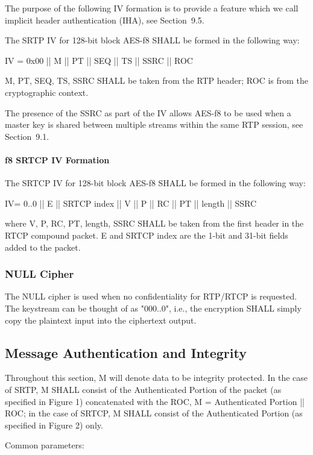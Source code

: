 \documentclass{article}
\begin{document}
The purpose of the following IV formation is to provide a feature which we call implicit header authentication (IHA), see Section~9.5.

The SRTP IV for 128-bit block AES-f8 SHALL be formed in the following way:

IV = 0x00 || M || PT || SEQ || TS || SSRC || ROC

M, PT, SEQ, TS, SSRC SHALL be taken from the RTP header; ROC is from the cryptographic context.

The presence of the SSRC as part of the IV allows AES-f8 to be used when a master key is shared between multiple streams within the same RTP session, see Section~9.1.

\paragraph{f8 SRTCP IV Formation}

The SRTCP IV for 128-bit block AES-f8 SHALL be formed in the following way:

IV= 0..0 || E || SRTCP index || V || P || RC || PT || length || SSRC

where V, P, RC, PT, length, SSRC SHALL be taken from the first header in the RTCP compound packet.  E and SRTCP index are the 1-bit and 31-bit fields added to the packet.

\subsubsection{NULL Cipher}

The NULL cipher is used when no confidentiality for RTP/RTCP is requested.  The keystream can be thought of as "000..0", i.e., the encryption SHALL simply copy the plaintext input into the ciphertext output.

\subsection{Message Authentication and Integrity}

Throughout this section, M will denote data to be integrity protected.  In the case of SRTP, M SHALL consist of the Authenticated Portion of the packet (as specified in Figure 1) concatenated with the ROC, M = Authenticated Portion || ROC; in the case of SRTCP, M SHALL consist of the Authenticated Portion (as specified in Figure 2) only.

Common parameters:
\end{document}

